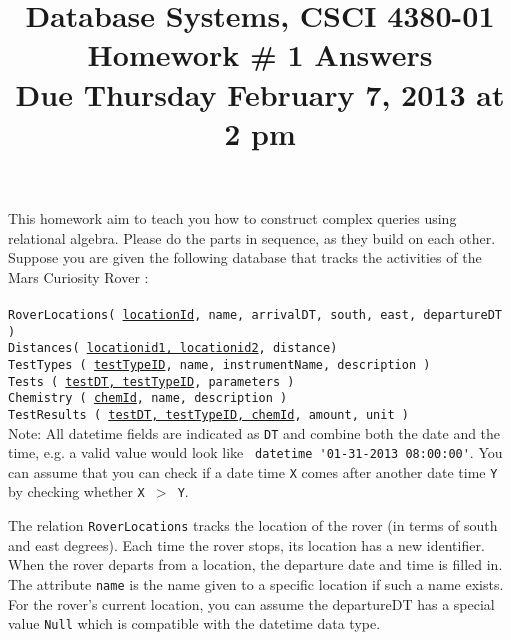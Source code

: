 \documentclass[11pt]{article}
\title{Database Systems, CSCI 4380-01 \\
Homework \# 1 Answers \\
Due Thursday February 7, 2013 at 2 pm}
\date{}
\begin{document}
\maketitle

\vspace*{-0.7in}

 This homework aim to teach you how
to construct complex queries using relational algebra. Please do the
parts in sequence, as they build on each other. Suppose you are given
the following database that tracks the activities of the Mars
Curiosity Rover : \\ \\
\hspace*{0.6in} {\tt RoverLocations( \underline{locationId}, name, arrivalDT, south, east, departureDT )}  \\
\hspace*{0.6in} {\tt Distances( \underline{locationid1, locationid2}, distance)} \\
\hspace*{0.6in} {\tt TestTypes ( \underline{testTypeID}, name, instrumentName, description )} \\
\hspace*{0.6in} {\tt Tests ( \underline{testDT, testTypeID}, parameters )} \\
\hspace*{0.6in} {\tt Chemistry ( \underline{chemId},  name, description )}  \\
\hspace*{0.6in} {\tt TestResults ( \underline{testDT, testTypeID, chemId}, amount, unit )} \\

Note: All datetime fields are indicated as {\tt DT} and combine both
the date and the time, e.g. a valid value would look like
\verb+ datetime '01-31-2013 08:00:00'+. You can assume that you can
check if a date time {\tt X} comes after another date time {\tt Y} by
checking whether {\tt X $>$ Y}.

The relation {\tt RoverLocations} tracks the location of the rover (in
terms of south and east degrees). Each time the rover stops, its
location has a new identifier. When the rover departs from a location,
the departure date and time is filled in. The attribute \verb+name+ is
the name given to a specific location if such a name exists. For the
rover's current location, you can assume the departureDT has a special
value {\tt Null} which is compatible with the datetime data type.
\end{document}
